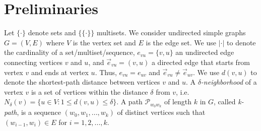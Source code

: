 \section{Preliminaries}
\label{sec:pre}
Let $\{\cdot\}$ denote sets and $\{\!\!\{\cdot\}\!\!\}$  multisets. 
We consider undirected simple graphs $G = (V, E)$ where $V$ is the vertex set and $E$ is the edge set. 
We use $\lvert\cdot\rvert$ to denote the cardinality of a set/multiset/sequence, $e_{vu} = \{v,u\}$ an undirected edge connecting vertices $v$ and $u$, and $\vec{e}_{vu} = (v,u)$ a directed edge that starts from vertex $v$ and ends at vertex $u$. Thus, $e_{vu} = e_{uv}$ and $\vec{e}_{vu} \neq \vec{e}_{uv}$. We use $d(v,u)$ to denote the shortest-path distance between vertices $v$ and $u$.
A \emph{$\delta$-neighborhood} of a vertex $v$ is a set of vertices within the distance $\delta$ from $v$, i.e. $N_{\delta}(v)=\{u\in V:1\leq d(v,u)\leq \delta\}$.
A path $\mathcal{P}_{w_0w_k}$ of length $k$ in $G$, called \emph{k-path}, is a sequence $(w_0, w_1, ..., w_k)$ of distinct vertices such that $(w_{i-1}, w_{i}) \in E$ for $i=1,2,...,k$. 

